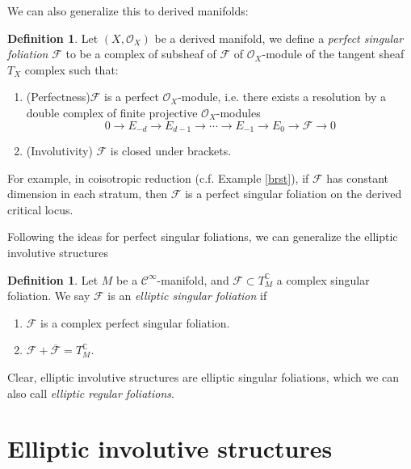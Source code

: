 \documentclass[12pt]{amsart}
\theoremstyle{definition}
\newtheorem{defn}[thm]{Definition}
\theoremstyle{remark}
\numberwithin{equation}{section}
\newcommand{\CF}{{\mathcal F}}
\newcommand{\CO}{{\mathcal O}}
\newcommand{\cinf}{{\mathcal C}^{\infty}}
\newcommand{\C}{{\mathbb{C}}}
\newcommand{\1}{{\mathbb{1}}}
\begin{document}
We can also generalize this to derived manifolds:
\begin{defn}
    Let $(X, \CO_X)$ be a derived manifold, we define a {\it perfect singular foliation} $\CF$ to be a complex of subsheaf of $\CF$ of $\CO_X$-module of the tangent sheaf $T_X$ complex such that:
    \begin{enumerate}
        \item (Perfectness)$\CF$ is a perfect $\CO_X$-module, i.e. there exists a resolution by a double complex of finite projective $\CO_X$-modules
        \begin{equation*}
            0\to E_{-d}\to E_{d-1}\to \cdots \to E_{-1}\to E_0 \to \CF \to 0  
        \end{equation*}
        \item (Involutivity) $\CF$ is closed under brackets.
    \end{enumerate}
\end{defn}
For example, in coisotropic reduction (c.f. Example \ref{brst}), if $\CF$ has constant dimension in each stratum, then  $\CF$ is a perfect singular foliation on the derived critical locus.

Following the ideas for perfect singular foliations, we can generalize the elliptic involutive structures
\begin{defn}
Let $M$ be a $\cinf$-manifold, and $\CF\subset T^{\C}_M$ a complex singular foliation. We say $\CF$ is an {\it elliptic singular foliation} if 
\begin{enumerate}
    \item $\CF$ is a complex perfect singular foliation.
    \item $\CF + \overline{\CF} = T^{\C}_M$.
\end{enumerate}
\end{defn}
Clear, elliptic involutive structures are elliptic singular foliations, which we can also call {\it elliptic regular foliations}.


\section{Elliptic involutive structures}
\end{document}
